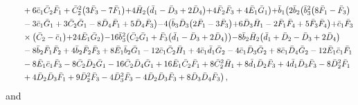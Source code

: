 \documentclass[10pt]{amsart}
\theoremstyle{definition}
\theoremstyle{corollary}
\theoremstyle{remark}
\theoremstyle{conclusion}
\begin{document}
\begin{align}
& \hskip 0.7cm+6 \bar{c}_1 \bar{C}_2 \bar{F}_1+\bar{C}_2^2 \bigl(3 \bar{F}_3-7 \bar{F}_1\bigl)+4 \bar{H}_2 \bigl(\bar{d}_1-\bar{D}_3+2 \bar{D}_4\bigl)+4 \bar{F}_2 \bar{F}_3+4 \bar{E}_1 \bar{G}_1\bigl)+\bar{b}_1 \bigl(2 \bar{b}_2 \bigl(\bar{b}_3^2 \bigl(8 \bar{F}_1-\bar{F}_3\bigl)\nonumber \\
& \hskip 0.7cm-3 \bar{c}_1 \bar{G}_1+3 \bar{C}_2 \bar{G}_1-8 \bar{D}_4 \bar{F}_1+5 \bar{D}_4 \bar{F}_3\bigl)-4 \bigl(\bar{b}_3 \bar{D}_3 \bigl(2 \bar{F}_1-3 \bar{F}_3\bigl)+6 \bar{D}_3 \bar{H}_1-2 \bar{F}_1 \bar{F}_4+5 \bar{F}_3 \bar{F}_4\bigl)+\bar{c}_1 \bar{F}_3\nonumber \\
& \hskip 0.7cm \times \bigl(\bar{C}_2-\bar{c}_1\bigl)+24 \bar{E}_1 \bar{G}_2\bigl)-16 \bar{b}_3^2 \bigl(\bar{C}_2 \bar{G}_1+\bar{F}_3 \bigl(\bar{d}_1-\bar{D}_3+2 \bar{D}_4\bigl)\bigl)-8 \bar{b}_2 \bar{H}_2 \bigl(\bar{d}_1+\bar{D}_2-\bar{D}_3+2 \bar{D}_4\bigl)\nonumber \\
& \hskip 0.7cm-8 \bar{b}_2 \bar{F}_1 \bar{F}_2+4 \bar{b}_2 \bar{F}_2 \bar{F}_3+8 \bar{E}_1 \bar{b}_2 \bar{G}_1-12 \bar{c}_1 \bar{C}_2 \bar{H}_1+4 \bar{c}_1 \bar{d}_1 \bar{G}_2-4 \bar{c}_1 \bar{D}_3 \bar{G}_2+8 \bar{c}_1 \bar{D}_4 \bar{G}_2-12 \bar{E}_1 \bar{c}_1 \bar{F}_1\nonumber \\
& \hskip 0.7cm-8 \bar{E}_1 \bar{c}_1 \bar{F}_3-8 \bar{C}_2 \bar{D}_2 \bar{G}_1-16 \bar{C}_2 \bar{D}_4 \bar{G}_1+16 \bar{E}_1\bar{C}_2 \bar{F}_1+8 \bar{C}_2^2 \bar{H}_1+8 \bar{d}_1 \bar{D}_2 \bar{F}_3+4 \bar{d}_1 \bar{D}_3 \bar{F}_3-8 \bar{D}_2^2 \bar{F}_1 \nonumber \\
& \hskip 0.7cm+4 \bar{D}_2 \bar{D}_3 \bar{F}_1+9 \bar{D}_2^2 \bar{F}_3-4 \bar{D}_3^2 \bar{F}_3-4 \bar{D}_2 \bar{D}_3 \bar{F}_3+8 \bar{D}_3 \bar{D}_4 \bar{F}_3\bigl)\, ,\nonumber
\end{align} and
\end{document}
